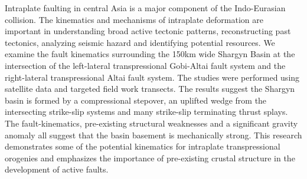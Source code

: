 \begin{abstractpage}
Intraplate faulting in central Asia is a major component of the Indo-Eurasian collision. The kinematics and mechanisms of intraplate deformation are important in understanding broad active tectonic patterns, reconstructing past tectonics, analyzing seismic hazard and identifying potential resources. We examine the fault kinematics surrounding the 150km wide Shargyn Basin at the intersection of the left-lateral transpressional Gobi-Altai fault system and the right-lateral transpressional Altai fault system. The studies were performed using satellite data and targeted field work transects. The results suggest the Shargyn basin is formed by a compressional stepover, an uplifted wedge from the intersecting strike-slip systems and many strike-slip terminating thrust splays. The fault-kinematics, pre-existing structural weaknesses and a significant gravity anomaly all suggest that the basin basement is mechanically strong. This research demonstrates some of the potential kinematics for intraplate transpressional orogenies and emphasizes the importance of pre-existing crustal structure in the development of active faults.
\end{abstractpage}
